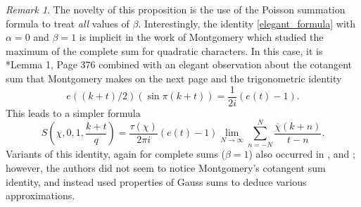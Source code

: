 \documentclass[12pt, a4paper]{amsart}
\theoremstyle{remark}
\newtheorem*{remark}{Remark}
\newcommand{\chibar}{\overline \chi}
\begin{document}
\begin{remark}
    The novelty of this proposition is the use of the Poisson summation
    formula to treat {\it all} values of $\beta.$ Interestingly, the identity \eqref{elegant_formula} with $\alpha=0$ and
    $\beta=1$ is implicit in the work of Montgomery which studied the
    maximum of the complete sum for quadratic characters. In this case, it is
    \cite{montgomery-fekete}*{Lemma 1, Page 376} combined with an elegant
    observation about the cotangent sum that Montgomery makes on the next page
    and the trigonometric identity
    \begin{equation*}
        e((k + t)/2)(\sin \pi (k+t)) = \frac{1}{2i}(e(t) - 1).
    \end{equation*}
    This leads to a simpler formula
    \[
        S\left(\chi, 0, 1, \frac{k+t}{q}\right) =
        \frac{\tau(\chi)}{2\pi i}(e(t)-1)
        \lim_{N \rightarrow \infty}\sum_{n=-N}^N \frac{\chibar(k + n)}{t - n}.
    \]
    Variants of this identity, again for complete sums ($\beta=1$) also occurred in \cite{CGPS-fekete},
    \cite{KLM-fekete} and \cite{mossinghoff-mahler}; however, the authors did not seem to notice Montgomery's
    cotangent sum identity, and instead used properties of Gauss sums to deduce various approximations.

\end{remark}
\end{document}
